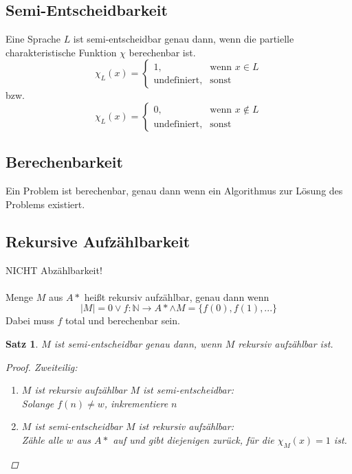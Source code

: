 \documentclass{article}
\begin{document}
\subsection{Semi-Entscheidbarkeit}
Eine Sprache $L$ ist semi-entscheidbar genau dann, wenn die partielle charakteristische Funktion $\chi$ berechenbar ist.
\begin{equation}
    \chi _L(x)=
    \begin{cases}
        1,                  & \text{wenn } x\in L \\
        \text{undefiniert}, & \text{sonst}
    \end{cases}
\end{equation}
bzw.
\begin{equation}
    \chi _L(x)=
    \begin{cases}
        0,                  & \text{wenn } x\not\in L \\
        \text{undefiniert}, & \text{sonst}
    \end{cases}
\end{equation}
\subsection{Berechenbarkeit}
Ein Problem ist berechenbar, genau dann wenn ein Algorithmus zur Lösung des Problems existiert.
\subsection{Rekursive Aufzählbarkeit}
\Rightarrow NICHT Abzählbarkeit!\\\\
Menge $M$ aus $A*$ heißt rekursiv aufzählbar, genau dann wenn
\begin{equation}
    |M|=0 \vee f:\mathbb{N}\rightarrow A* \wedge M=\{f(0), f(1),...\}
\end{equation}
Dabei muss $f$ total und berechenbar sein.\\
\newtheorem{RaSe}{Satz}
\begin{framed}
    \begin{RaSe}
        $M$ ist semi-entscheidbar genau dann, wenn $M$ rekursiv aufzählbar ist.
        \begin{proof}
            Zweiteilig:
            \begin{enumerate}
                \item $M$ ist rekursiv aufzählbar \Rightarrow $M$ ist semi-entscheidbar:\\
                      Solange $f(n) \not= w$, inkrementiere $n$
                \item $M$ ist semi-entscheidbar \Rightarrow $M$ ist rekursiv aufzählbar:\\
                      Zähle alle $w$ aus $A*$ auf und gibt diejenigen zurück, für die $\chi_M(x) = 1$ ist.
                      \qedhere
            \end{enumerate}
        \end{proof}
    \end{RaSe}
\end{framed}
\end{document}
